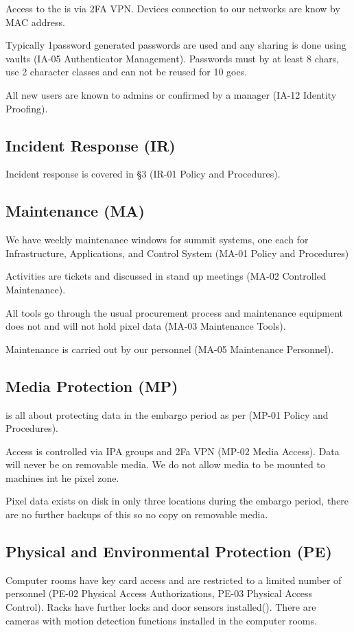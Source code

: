 Access to the \PZ is via 2FA VPN.
Devices connection to our networks are know by MAC address.

Typically 1password generated passwords are used and any sharing is done using vaults (IA-05  Authenticator Management).
Passwords must by at least 8 chars, use 2 character classes and can not be reused for 10 goes.

All new users are known to admins or confirmed by a manager (IA-12  Identity Proofing).

\subsection{Incident Response (IR)} \label{sec:IR}
Incident response is covered in  \S3 (IR-01  Policy and Procedures).

\subsection{Maintenance (MA)} \label{sec:MA}
We have weekly maintenance windows for summit systems, one each for Infrastructure, Applications, and Control System (MA-01  Policy and Procedures)

Activities are tickets and discussed in stand up meetings (MA-02  Controlled Maintenance).

All tools go through the usual procurement process and maintenance equipment does not and will not hold pixel data (MA-03  Maintenance Tools).

Maintenance is carried out by our personnel (MA-05  Maintenance Personnel).


\subsection{Media Protection (MP)} \label{sec:MP}
\PZ is all about protecting data in the embargo period as per (MP-01  Policy and Procedures).

Access is controlled via IPA groups and 2Fa VPN (MP-02  Media Access).
Data will never be on removable media.
We do not allow media to be mounted to machines int he pixel zone.

Pixel data exists on disk in only three locations during the embargo period, there are no further backups of this so no copy on removable media.

\subsection{Physical and Environmental Protection (PE)} \label{sec:PE}
Computer rooms have key card access and are restricted to a limited number of personnel (PE-02  Physical Access Authorizations, PE-03  Physical Access Control).
Racks have further locks and door sensors installed().
There are cameras with motion detection functions installed in the computer rooms.


